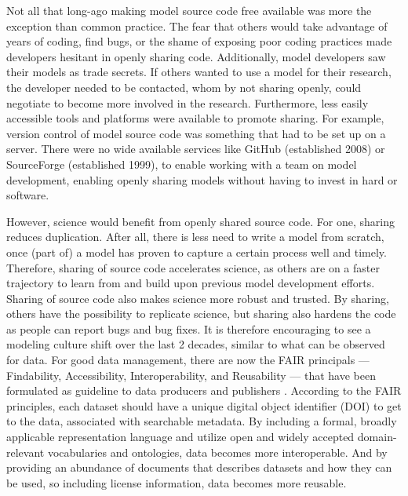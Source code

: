 \documentclass[12pt]{amsart}
\begin{document}
Not all that long-ago making model source code free available was more the exception than common practice. The fear that others would take advantage of years of coding, find bugs, or the shame of exposing poor coding practices made developers hesitant in openly sharing code. Additionally, model developers saw their models as trade secrets. If others wanted to use a model for their research, the developer needed to be contacted, whom by not sharing openly, could negotiate to become more involved in the research. Furthermore, less easily accessible tools and platforms were available to promote sharing. For example, version control of model source code was something that had to be set up on a server. There were no wide available services like GitHub (established 2008) or SourceForge (established 1999), to enable working with a team on model development, enabling openly sharing models without having to invest in hard or software.

However, science would benefit from openly shared source code. For one, sharing reduces duplication. After all, there is less need to write a model from scratch, once (part of) a model has proven to capture a certain process well and timely. Therefore, sharing of source code accelerates science, as others are on a faster trajectory to learn from and build upon previous model development efforts. Sharing of source code also makes science more robust and trusted. By sharing, others have the possibility to replicate science, but sharing also hardens the code as people can report bugs and bug fixes. It is therefore encouraging to see a modeling culture shift over the last 2 decades, similar to what can be observed for data. For good data management, there are now the FAIR principals —Findability, Accessibility, Interoperability, and Reusability — that have been formulated as guideline to data producers and publishers \cite{wilkinson2016fair}. According to the FAIR principles, each dataset should have a unique digital object identifier (DOI) to get to the data, associated with searchable metadata. By including a formal, broadly applicable representation language and utilize open and widely accepted domain-relevant vocabularies and ontologies, data becomes more interoperable. And by providing an abundance of documents that describes datasets and how they can be used, so including license information, data becomes more reusable.
\end{document}
